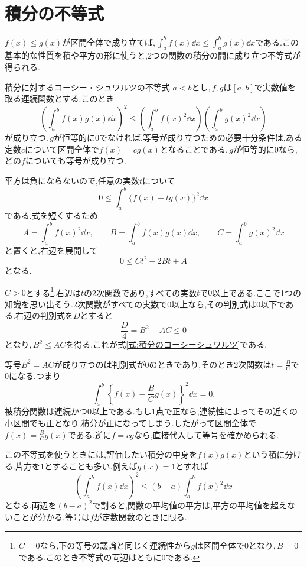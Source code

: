 \section{積分の不等式}\label{節:積分の不等式}

$f(x)\le g(x)$が区間全体で成り立てば,\,$\int_a^b f(x)\dd x\le\int_a^b g(x)\dd x$である.この基本的な性質を積や平方の形に使うと,2つの関数の積分の間に成り立つ不等式が得られる.

\begin{theorem}{積分に対するコーシー・シュワルツの不等式}
$a<b$とし,\,$f,g$は$[a,b]$で実数値を取る連続関数とする.このとき
\begin{equation}\label{式:積分のコーシーシュワルツ}
 \left(\int_a^b f(x)g(x)\dd x\right)^2
 \le
 \left(\int_a^b f(x)^2\dd x\right)
 \left(\int_a^b g(x)^2\dd x\right)
\end{equation}
が成り立つ.\,$g$が恒等的に$0$でなければ,等号が成り立つための必要十分条件は,ある定数$c$について区間全体で$f(x)=cg(x)$となることである.\,$g$が恒等的に$0$なら,どの$f$についても等号が成り立つ.
\end{theorem}

平方は負にならないので,任意の実数$t$について
\[
 0\le\int_a^b\{f(x)-tg(x)\}^2\dd x
\]
である.式を短くするため
\[
 A=\int_a^b f(x)^2\dd x,\qquad
 B=\int_a^b f(x)g(x)\dd x,\qquad
 C=\int_a^b g(x)^2\dd x
\]
と置くと,右辺を展開して
\[
 0\le Ct^2-2Bt+A
\]
となる.

$C>0$とする\footnote{$C=0$なら,下の等号の議論と同じく連続性から$g$は区間全体で$0$となり,\,$B=0$である.このとき不等式の両辺はともに$0$である.}.右辺は$t$の2次関数であり,すべての実数$t$で$0$以上である.ここで1つの知識を思い出そう.2次関数がすべての実数で$0$以上なら,その判別式は$0$以下である.右辺の判別式を$D$とすると
\[
 \frac{D}{4}=B^2-AC\le0
\]
となり,\,$B^2\le AC$を得る.これが式\eqref{式:積分のコーシーシュワルツ}である.

等号$B^2=AC$が成り立つのは判別式が$0$のときであり,そのとき2次関数は$t=\frac BC$で$0$になる.つまり
\[
 \int_a^b\left\{f(x)-\frac BCg(x)\right\}^2\dd x=0.
\]
被積分関数は連続かつ$0$以上である.もし1点で正なら,連続性によってその近くの小区間でも正となり,積分が正になってしまう.したがって区間全体で$f(x)=\frac BCg(x)$である.逆に$f=cg$なら,直接代入して等号を確かめられる.

この不等式を使うときには,評価したい積分の中身を$f(x)g(x)$という積に分ける.片方を$1$とすることも多い.例えば$g(x)=1$とすれば
\begin{equation}\label{式:平均と二乗平均}
 \left(\int_a^b f(x)\dd x\right)^2
 \le(b-a)\int_a^b f(x)^2\dd x
\end{equation}
となる.両辺を$(b-a)^2$で割ると,関数の平均値の平方は,平方の平均値を超えないことが分かる.等号は$f$が定数関数のときに限る.

